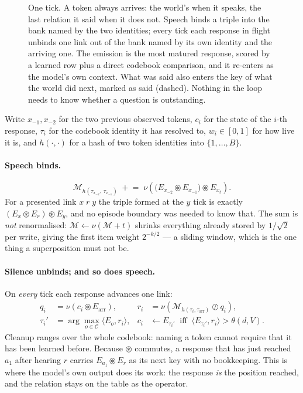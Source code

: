 \documentclass[11pt,a4paper]{article}
\newcommand{\bind}{\mathbin{\circledast}}
\newcommand{\unbind}{\mathbin{\oslash}}
\newcommand{\nrm}[1]{\nu\!\left(#1\right)}
\newcommand{\CB}{\mathcal{C}}
\newcommand{\Mem}{\mathcal{M}}
\theoremstyle{plain}
\theoremstyle{definition}
\theoremstyle{remark}
\begin{document}
\begin{figure}[t]
\caption{One tick. A token always arrives: the world's when it speaks, the last
relation it said when it does not. Speech binds a triple into the bank named by
the two identities; every tick each response in flight unbinds one link out of
the bank named by its own identity and the arriving one. The emission is the
most matured response, scored by a learned row plus a direct codebook
comparison, and it re-enters as the model's own context. What was said also
enters the key of what the world did next, marked as said (dashed). Nothing in
the loop needs to know whether a question is outstanding.}
\label{fig:tick}
\end{figure}

Write $x_{-1},x_{-2}$ for the two previous observed tokens, $c_i$ for the state
of the $i$-th response, $\tau_i$ for the codebook identity it has resolved to,
$w_i\in[0,1]$ for how live it is, and $h(\cdot,\cdot)$ for a hash of two token
identities into $\{1,\dots,B\}$.

\paragraph{Speech binds.}
\begin{equation}
\Mem_{h(\tau_{x_{-2}},\,\tau_{x_{-1}})}
\;\mathrel{+}=\;
\nrm{\big(E_{x_{-2}}\bind E_{x_{-1}}\big)\bind E_{x_t}} .
\label{eq:write}
\end{equation}
For a presented link $x\;r\;y$ the triple formed at the $y$ tick is exactly
$(E_x\bind E_r)\bind E_y$, and no episode boundary was needed to know that. The
sum is \emph{not} renormalised: $\Mem\leftarrow\nu(\Mem+t)$ shrinks everything
already stored by $1/\sqrt2$ per write, giving the first item weight $2^{-k/2}$
--- a sliding window, which is the one thing a superposition must not be.

\paragraph{Silence unbinds; and so does speech.} On \emph{every} tick each
response advances one link:
\begin{align}
q_i &= \nrm{c_i \bind E_{\text{arr}}}, &
r_i &= \nrm{\Mem_{h(\tau_i,\tau_{\text{arr}})} \unbind q_i}, \label{eq:read}\\
\tau_i' &= \arg\max_{o\in\CB} \langle E_o, r_i\rangle, &
c_i &\leftarrow E_{\tau_i'} \ \text{ iff } \
\langle E_{\tau_i'},r_i\rangle > \theta(d,V). \label{eq:cleanup}
\end{align}
Cleanup ranges over the whole codebook: naming a token cannot require that it
has been learned before. Because $\bind$ commutes, a response that has just
reached $a_1$ after hearing $r$ carries $E_{a_1}\bind E_r$ as its next key with
no bookkeeping. This is where the model's own output does its work: the
response \emph{is} the position reached, and the relation stays on the table as
the operator.
\end{document}
